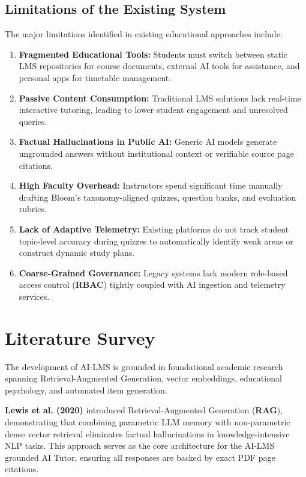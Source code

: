 \subsection{Limitations of the Existing System}

The major limitations identified in existing educational approaches include:

\begin{enumerate}
    \item \textbf{Fragmented Educational Tools:} Students must switch between static LMS repositories for course documents, external AI tools for assistance, and personal apps for timetable management.
    
    \item \textbf{Passive Content Consumption:} Traditional LMS solutions lack real-time interactive tutoring, leading to lower student engagement and unresolved queries.
    
    \item \textbf{Factual Hallucinations in Public AI:} Generic AI models generate ungrounded answers without institutional context or verifiable source page citations.
    
    \item \textbf{High Faculty Overhead:} Instructors spend significant time manually drafting Bloom's taxonomy-aligned quizzes, question banks, and evaluation rubrics.
    
    \item \textbf{Lack of Adaptive Telemetry:} Existing platforms do not track student topic-level accuracy during quizzes to automatically identify weak areas or construct dynamic study plans.
    
    \item \textbf{Coarse-Grained Governance:} Legacy systems lack modern role-based access control (\textbf{RBAC}) tightly coupled with AI ingestion and telemetry services.
\end{enumerate}

\section{Literature Survey}

The development of AI-LMS is grounded in foundational academic research spanning Retrieval-Augmented Generation, vector embeddings, educational psychology, and automated item generation.

\textbf{Lewis et al. (2020)} introduced Retrieval-Augmented Generation (\textbf{RAG}), demonstrating that combining parametric LLM memory with non-parametric dense vector retrieval eliminates factual hallucinations in knowledge-intensive NLP tasks. This approach serves as the core architecture for the AI-LMS grounded AI Tutor, ensuring all responses are backed by exact PDF page citations.

